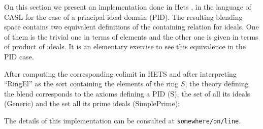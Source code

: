 On this section we present an implementation done in
Hets \parencite{Mossakowskihets}, in the language of CASL for the case
of a principal ideal domain (PID).  The resulting blending space
contains two equivalent definitions of the containing relation for
ideals. One of them is the trivial one in terms of elements and the
other one is given in terms of product of ideals. It is an elementary
exercise to see this equivalence in the PID case.


After computing the corresponding colimit in HETS and after
interpreting ``RingEl'' as the sort containing the elements of the ring
$S$, the theory defining the blend corresponds to the axioms defining
a PID (S), the set of all its ideals (Generic) and the set all its
prime ideals (SimplePrime):


The details of this implementation can be consulted at \texttt{somewhere/on/line}.



